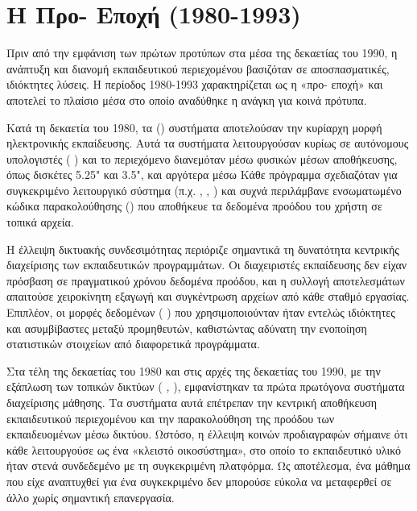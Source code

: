\section{Η Προ- Εποχή (1980-1993)}
\label{sec:pre_standardization}

Πριν από την εμφάνιση των πρώτων προτύπων  στα μέσα της δεκαετίας του 1990, η ανάπτυξη και διανομή εκπαιδευτικού περιεχομένου βασιζόταν σε αποσπασματικές, ιδιόκτητες λύσεις. Η περίοδος 1980-1993 χαρακτηρίζεται ως η «προ- εποχή» και αποτελεί το πλαίσιο μέσα στο οποίο αναδύθηκε η ανάγκη για κοινά πρότυπα.

Κατά τη δεκαετία του 1980, τα \textit{ } () συστήματα αποτελούσαν την κυρίαρχη μορφή ηλεκτρονικής εκπαίδευσης. Αυτά τα συστήματα λειτουργούσαν κυρίως σε αυτόνομους υπολογιστές ( ) και το περιεχόμενο διανεμόταν μέσω φυσικών μέσων αποθήκευσης, όπως δισκέτες 5.25" και 3.5", και αργότερα μέσω  Κάθε  πρόγραμμα σχεδιαζόταν για συγκεκριμένο λειτουργικό σύστημα (π.χ. ,  , ) και συχνά περιλάμβανε ενσωματωμένο κώδικα παρακολούθησης (\textit{}) που αποθήκευε τα δεδομένα προόδου του χρήστη σε τοπικά αρχεία.

Η έλλειψη δικτυακής συνδεσιμότητας περιόριζε σημαντικά τη δυνατότητα κεντρικής διαχείρισης των εκπαιδευτικών προγραμμάτων. Οι διαχειριστές εκπαίδευσης δεν είχαν πρόσβαση σε πραγματικού χρόνου δεδομένα προόδου, και η συλλογή αποτελεσμάτων απαιτούσε χειροκίνητη εξαγωγή και συγκέντρωση αρχείων από κάθε σταθμό εργασίας. Επιπλέον, οι μορφές δεδομένων (\textit{ }) που χρησιμοποιούνταν ήταν εντελώς ιδιόκτητες και ασυμβίβαστες μεταξύ προμηθευτών, καθιστώντας αδύνατη την ενοποίηση στατιστικών στοιχείων από διαφορετικά  προγράμματα.

Στα τέλη της δεκαετίας του 1980 και στις αρχές της δεκαετίας του 1990, με την εξάπλωση των τοπικών δικτύων (\textit{  , }), εμφανίστηκαν τα πρώτα πρωτόγονα συστήματα διαχείρισης μάθησης. Τα συστήματα αυτά επέτρεπαν την κεντρική αποθήκευση εκπαιδευτικού περιεχομένου και την παρακολούθηση της προόδου των εκπαιδευομένων μέσω δικτύου. Ωστόσο, η έλλειψη κοινών προδιαγραφών σήμαινε ότι κάθε  λειτουργούσε ως ένα «κλειστό οικοσύστημα», στο οποίο το εκπαιδευτικό υλικό ήταν στενά συνδεδεμένο με τη συγκεκριμένη πλατφόρμα. Ως αποτέλεσμα, ένα μάθημα που είχε αναπτυχθεί για ένα συγκεκριμένο  δεν μπορούσε εύκολα να μεταφερθεί σε άλλο χωρίς σημαντική επανεργασία.

